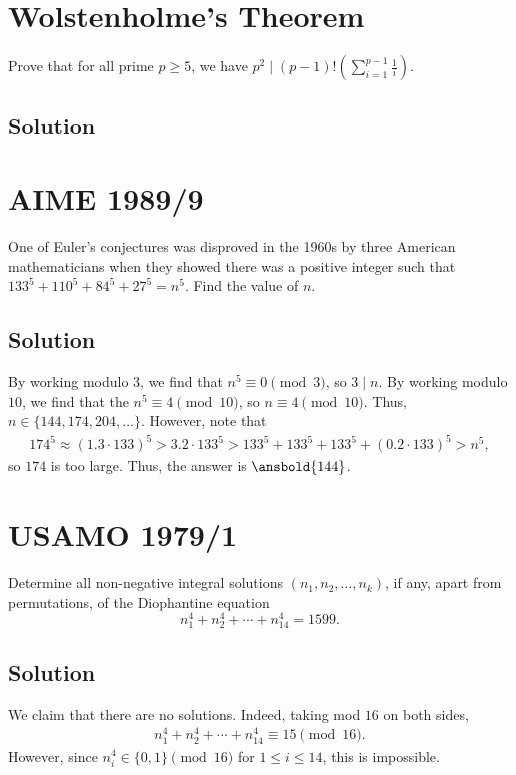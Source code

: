\documentclass[mast]{lucky}
\begin{document}
\pagebreak\section{Wolstenholme's Theorem}

Prove that for all prime $p\ge5$, we have $p^2\mid (p-1)!\left(\sum\limits_{i=1}^{p-1}\frac1{i}\right)$.

\subsection{Solution}

\pagebreak\section{AIME 1989/9}

One of Euler's conjectures was disproved in the 1960s by three American mathematicians when they showed there was a positive integer such that $133^5+110^5+84^5+27^5=n^{5}$. Find the value of $n$.

\subsection{Solution}

By working modulo $3$, we find that $n^5 \equiv 0 \pmod 3$, so $3 \mid n$. By working modulo $10$, we find that the $n^5 \equiv 4 \pmod{10}$, so $n \equiv 4 \pmod{10}$. Thus, $n \in \{144, 174, 204, \dots\}$. However, note that 
\begin{align*}
174^5 \approx (1.3 \cdot 133)^5 > 3.2 \cdot 133^5 > 133^5 + 133^5 + 133^5 + (0.2 \cdot 133)^5 > n^5,
\end{align*}
so $174$ is too large. Thus, the answer is $\ansbold{144}$.

\pagebreak\section{USAMO 1979/1}

Determine all non-negative integral solutions $(n_1, n_2, \dots , n_k)$, if any, apart from permutations, of the Diophantine equation
$$n_1^4 + n_2^4 + \cdots + n_{14}^{4} = 1599.$$

\subsection{Solution}

We claim that there are no solutions. Indeed, taking mod $16$ on both sides,
\begin{align*}
n_1^4 + n_2^4 + \cdots + n_{14}^4 \equiv 15 \pmod{16}.
\end{align*}
However, since $n_i^4 \in \{0, 1\} \pmod{16}$ for $1 \leq i \leq 14$, this is impossible.
\end{document}
